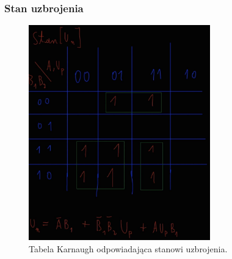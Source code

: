 \documentclass{article}
\begin{document}
\subsubsection{Stan uzbrojenia}
\begin{figure}[H]
\includegraphics[width=0.7\textwidth]{Kalarm}
\caption{Tabela Karnaugh odpowiadająca stanowi uzbrojenia.}
\end{figure}
\end{document}
